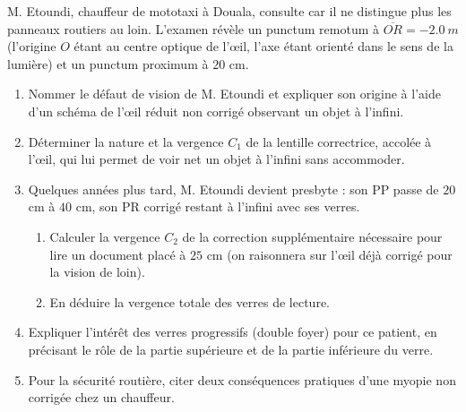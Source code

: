 \documentclass[11pt]{article}
\begin{document}
\begin{exercice}
M. Etoundi, chauffeur de mototaxi à Douala, consulte car il ne distingue plus les panneaux routiers au loin. L'examen révèle un punctum remotum à $\overline{OR} = -\SI{2,0}{m}$ (l'origine $O$ étant au centre optique de l'œil, l'axe étant orienté dans le sens de la lumière) et un punctum proximum à $20$ cm.
\begin{enumerate}
\item Nommer le défaut de vision de M. Etoundi et expliquer son origine à l'aide d'un schéma de l'œil réduit non corrigé observant un objet à l'infini.
\item Déterminer la nature et la vergence $C_1$ de la lentille correctrice, accolée à l'œil, qui lui permet de voir net un objet à l'infini sans accommoder.
\item Quelques années plus tard, M. Etoundi devient presbyte : son PP passe de $20$ cm à $40$ cm, son PR corrigé restant à l'infini avec ses verres.
\begin{enumerate}
\item Calculer la vergence $C_2$ de la correction supplémentaire nécessaire pour lire un document placé à $25$ cm (on raisonnera sur l'œil déjà corrigé pour la vision de loin).
\item En déduire la vergence totale des verres de lecture.
\end{enumerate}
\item Expliquer l'intérêt des verres progressifs (double foyer) pour ce patient, en précisant le rôle de la partie supérieure et de la partie inférieure du verre.
\item Pour la sécurité routière, citer deux conséquences pratiques d'une myopie non corrigée chez un chauffeur.
\end{enumerate}
\end{exercice}
\end{document}

